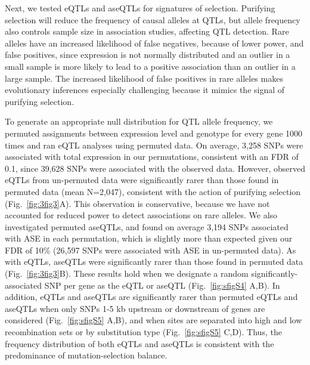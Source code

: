 Next, we tested eQTLs and aseQTLs for signatures of selection. Purifying selection will reduce the frequency of causal alleles at QTLs, but allele frequency also controls sample size in association studies, affecting QTL detection. Rare alleles have an increased likelihood of false negatives, because of lower power, and false positives, since expression is not normally distributed and an outlier in a small sample is more likely to lead to a positive association than an outlier in a large sample. The increased likelihood of false positives in rare alleles makes evolutionary inferences especially challenging because it mimics the signal of purifying selection.

To generate an appropriate null distribution for QTL allele frequency, we permuted assignments between expression level and genotype for every gene 1000 times and ran eQTL analyses using permuted data. On average, 3,258 SNPs were associated with total expression in our permutations, consistent with an FDR of 0.1, since 39,628 SNPs were associated with the observed data. However, observed eQTLs from un-permuted data were significantly rarer than those found in permuted data (mean N=2,047), consistent with the action of purifying selection (Fig.~\ref{fig:3fig3}A). This observation is conservative, because we have not accounted for reduced power to detect associations on rare alleles. We also investigated permuted aseQTLs, and found on average 3,194 SNPs associated with ASE in each permutation, which is slightly more than expected given our FDR of 10\% (26,597 SNPs were associated with ASE in un-permuted data). As with eQTLs, aseQTLs were significantly rarer than those found in permuted data (Fig.~\ref{fig:3fig3}B). These results hold when we designate a random significantly-associated SNP per gene as the eQTL or aseQTL (Fig.~\ref{fig:sfigS4} A,B). In addition, eQTLs and aseQTLs are significantly rarer than permuted eQTLs and aseQTLs when only SNPs 1-5 kb upstream or downstream of genes are considered (Fig.~\ref{fig:sfigS5} A,B), and when sites are separated into high and low recombination sets or by substitution type (Fig.~\ref{fig:sfigS5} C,D). Thus, the frequency distribution of both eQTLs and aseQTLs is consistent with the predominance of mutation-selection balance.

